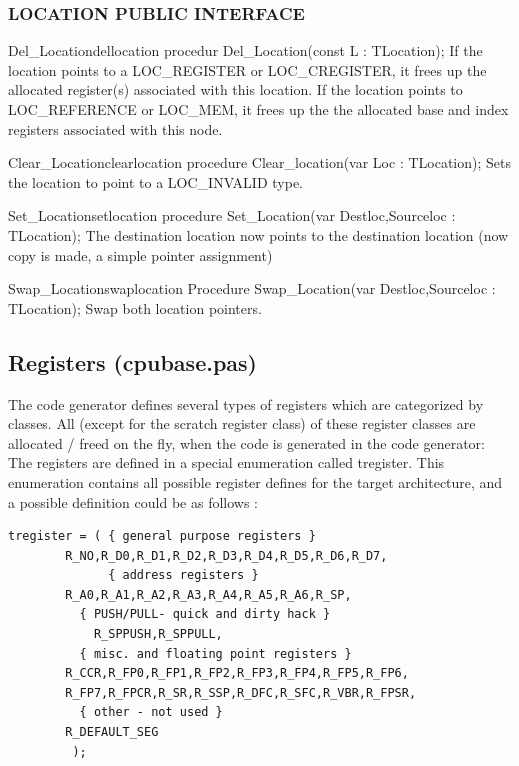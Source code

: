\documentclass [a4paper,12pt]{article}
\begin{document}
\subsubsection{LOCATION PUBLIC INTERFACE}
\label{subsubsec:location}

\begin{procedurel}{Del{\_}Location}{dellocation}
\Declaration
procedur Del{\_}Location(const L : TLocation);
\Description
If the location points to a LOC{\_}REGISTER or LOC{\_}CREGISTER, it frees up
the allocated register(s) associated with this location. If the location
points to LOC{\_}REFERENCE or LOC{\_}MEM, it frees up the the allocated base
and index registers associated with this node.
\end{procedurel}

\begin{procedurel}{Clear{\_}Location}{clearlocation}
\Declaration
procedure Clear{\_}location(var Loc : TLocation);
\Description
Sets the location to point to a LOC{\_}INVALID type.
\end{procedurel}

\begin{procedurel}{Set{\_}Location}{setlocation}
\Declaration
procedure Set{\_}Location(var Destloc,Sourceloc : TLocation);
\Description
The destination location now points to the destination location (now copy is
made, a simple pointer assignment)
\end{procedurel}

\begin{procedurel}{Swap{\_}Location}{swaplocation}
\Declaration
Procedure Swap{\_}Location(var Destloc,Sourceloc : TLocation);
\Description
Swap both location pointers.
\end{procedurel}

\subsection{Registers (cpubase.pas)}
\label{subsec:registers}

The code generator defines several types of registers which are categorized
by classes. All (except for the scratch register class) of these register
classes are allocated / freed on the fly, when the code is generated in the
code generator: The registers are defined in a special enumeration called
tregister. This enumeration contains all possible register defines for the
target architecture, and a possible definition could be as follows :

\begin{verbatim}
tregister = ( { general purpose registers }
		R_NO,R_D0,R_D1,R_D2,R_D3,R_D4,R_D5,R_D6,R_D7,
              { address registers }
		R_A0,R_A1,R_A2,R_A3,R_A4,R_A5,R_A6,R_SP,
	      { PUSH/PULL- quick and dirty hack }
	        R_SPPUSH,R_SPPULL,
	      { misc. and floating point registers }
		R_CCR,R_FP0,R_FP1,R_FP2,R_FP3,R_FP4,R_FP5,R_FP6,
		R_FP7,R_FPCR,R_SR,R_SSP,R_DFC,R_SFC,R_VBR,R_FPSR,
	      { other - not used }
		R_DEFAULT_SEG
	     );

\end{verbatim}
\end{document}
